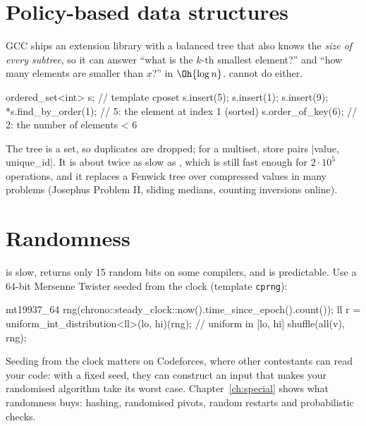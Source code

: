 \section[Policy-based data structures]{Policy-based data structures \hfill \gold}\label{sec:pbds}

GCC ships an extension library with a balanced tree that also knows the \emph{size of every subtree}, so it can answer
``what is the $k$-th smallest element?'' and ``how many elements are smaller than $x$?'' in $\Oh{\log n}$. 
cannot do either.

\begin{code}
ordered_set<int> s;                    // template cposet
s.insert(5); s.insert(1); s.insert(9);
*s.find_by_order(1);                   // 5: the element at index 1 (sorted)
s.order_of_key(6);                     // 2: the number of elements < 6
\end{code}

The tree is a set, so duplicates are dropped; for a multiset, store pairs \cc|{value, unique_id}|. It is about twice as slow
as , which is still fast enough for $2 \cdot 10^5$ operations, and it replaces a Fenwick tree over compressed
values in many problems (Josephus Problem II, sliding medians, counting inversions online).

\section[Randomness]{Randomness \hfill \gold}\label{sec:random-stl}

 is slow, returns only 15 random bits on some compilers, and is predictable. Use a 64-bit Mersenne Twister seeded
from the clock (template \texttt{cprng}):

\begin{code}
mt19937_64 rng(chrono::steady_clock::now().time_since_epoch().count());
ll r = uniform_int_distribution<ll>(lo, hi)(rng);   // uniform in [lo, hi]
shuffle(all(v), rng);
\end{code}

Seeding from the clock matters on Codeforces, where other contestants can read your code: with a fixed seed, they can
construct an input that makes your randomised algorithm take its worst case. Chapter~\ref{ch:special} shows what randomness
buys: hashing, randomised pivots, random restarts and probabilistic checks.

